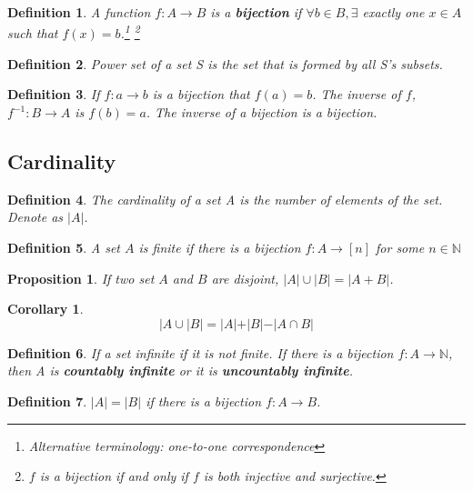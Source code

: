 \documentclass[12pt]{article}
\newtheorem{definition}{Definition}[subsection]
\newtheorem{proposition}{Proposition}[subsection]
\newtheorem{corollary}{Corollary}[subsection]
\begin{document}
		\begin{definition}
			A function $f : A \rightarrow B$ is a \textbf{bijection} if $\forall b \in B, \exists$ exactly one $x \in A$ such that $f(x) = b$.\footnote{Alternative terminology: one-to-one correspondence}
				\footnote{$f$ is a bijection if and only if $f$ is both injective and surjective.}
		\end{definition}
		
		\begin{definition}
			Power set of a set S is the set that is formed by all S's subsets.
		\end{definition}
		
		\begin{definition}
			If $f : a \rightarrow b$ is a bijection that $f(a) = b$. The inverse of $f$, $f^{-1}: B \rightarrow A$ is $f(b) = a$. The inverse of a bijection is a bijection.
		\end{definition}
		\subsection{Cardinality}
		
			\begin{definition}
				The cardinality of a set A is the number of elements of the set. Denote as $|A|$.
			\end{definition}
			
			\begin{definition}
				A set $A$ is finite if there is a bijection $f: A \rightarrow [n]$ for some $n \in \mathbb{N}$
			\end{definition}
			
			\begin{proposition}
				If two set $A$ and $B$ are disjoint, $|A| \cup |B| = |A + B|$.
			\end{proposition}
			
			\begin{corollary}
				\[|A \cup |B| = |A| + |B| - |A \cap B|\]
			\end{corollary}
			
			\begin{definition}
				If a set infinite if it is not finite. If there is a bijection $f : A \rightarrow \mathbb{N}$, then A is \textbf{countably infinite} or it is \textbf{uncountably infinite}.
			\end{definition}
			
			\begin{definition}
				$|A| = |B|$ if there is a bijection $f : A \rightarrow B$.
			\end{definition}
\end{document}
